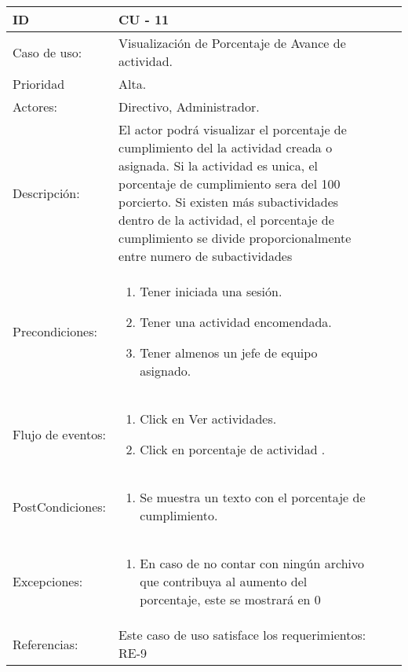 \documentclass[11pt,a4paper]{article}
\begin{document}
\begin{tabular}[c]{|p{3cm}|p{13cm}|p{2.5cm}|p{3cm}|}
\hline 
\rule[-1ex]{0pt}{2.5ex} ID & CU - 11 \\ 
\hline 
\rule[-1ex]{0pt}{2.5ex} Caso de uso: & Visualización de Porcentaje de Avance de actividad. \\ 
\hline 
\rule[-1ex]{0pt}{2.5ex} Prioridad & Alta. \\ 
\hline 
\rule[-1ex]{0pt}{2.5ex} Actores: & Directivo, Administrador.\\ 
\hline 
\rule[-1ex]{0pt}{2.5ex} Descripción: & El actor podrá visualizar el porcentaje de cumplimiento del
la actividad creada o asignada.
Si la actividad es unica, el porcentaje de cumplimiento sera del 100 porcierto. Si existen más subactividades dentro de la actividad, el porcentaje de cumplimiento
se divide proporcionalmente entre numero de subactividades \\ 
\hline 
\rule[-1ex]{0pt}{2.5ex}Precondiciones: & \begin{enumerate}
\item Tener iniciada una sesión.
\item Tener una actividad encomendada.
\item Tener almenos un jefe de equipo asignado.
\end{enumerate} \\ 
\hline 
\rule[-1ex]{0pt}{2.5ex} Flujo de eventos: & \begin{enumerate} 
\item Click en Ver actividades.
\item Click en porcentaje de actividad .
\end{enumerate}
\\ 
\hline 
\rule[-1ex]{0pt}{2.5ex} PostCondiciones:& \begin{enumerate}  
\item Se muestra un texto con el porcentaje de cumplimiento.
\end{enumerate} \\ 
\hline 
\rule[-1ex]{0pt}{2.5ex} Excepciones: & \begin{enumerate} 
\item En caso de no contar con ningún archivo que contribuya al aumento del porcentaje, este se mostrará en 0%
\end{enumerate} \\ 
\hline 
\rule[-1ex]{0pt}{2.5ex} Referencias: & Este caso de uso satisface los requerimientos: RE-9\\
\hline 

\end{tabular} 
\end{document}
